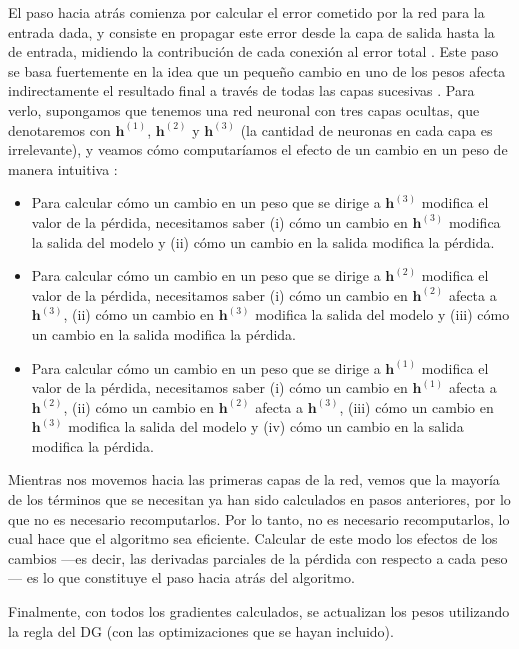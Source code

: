 \documentclass[../../main.tex]{subfiles}
\begin{document}
El paso hacia atrás comienza por calcular el error cometido por la red para la entrada
dada, y consiste en propagar este error desde la capa de salida hasta la de entrada,
midiendo la contribución de cada conexión al error total \cite{hands-on-ML-sklearn-tf}.
Este paso se basa fuertemente en la idea que un pequeño cambio en uno de los pesos afecta
indirectamente el resultado final a través de todas las capas sucesivas
\cite{prince2024understanding}. Para verlo, supongamos que tenemos una red neuronal con
tres capas ocultas, que denotaremos con \(\bm{h}^{(1)}\), \(\bm{h}^{(2)}\) y
\(\bm{h}^{(3)}\) (la cantidad de neuronas en cada capa es irrelevante), y veamos cómo
computaríamos el efecto de un cambio en un peso de manera intuitiva
\cite{prince2024understanding}:
\begin{itemize}
    \item Para calcular cómo un cambio en un peso que se dirige a \(\bm{h}^{(3)}\)
    modifica el valor de la pérdida, necesitamos saber (i) cómo un cambio en
    \(\bm{h}^{(3)}\) modifica la salida del modelo y (ii) cómo un cambio en la salida
    modifica la pérdida.
    \item Para calcular cómo un cambio en un peso que se dirige a \(\bm{h}^{(2)}\)
    modifica el valor de la pérdida, necesitamos saber (i) cómo un cambio en
    \(\bm{h}^{(2)}\) afecta a \(\bm{h}^{(3)}\), (ii) cómo un cambio en \(\bm{h}^{(3)}\)
    modifica la salida del modelo y (iii) cómo un cambio en la salida modifica la pérdida.
    \item Para calcular cómo un cambio en un peso que se dirige a \(\bm{h}^{(1)}\)
    modifica el valor de la pérdida, necesitamos saber (i) cómo un cambio en
    \(\bm{h}^{(1)}\) afecta a \(\bm{h}^{(2)}\), (ii) cómo un cambio en \(\bm{h}^{(2)}\)
    afecta a \(\bm{h}^{(3)}\), (iii) cómo un cambio en \(\bm{h}^{(3)}\) modifica la salida
    del modelo y (iv) cómo un cambio en la salida modifica la pérdida.
\end{itemize}
Mientras nos movemos hacia las primeras capas de la red, vemos que la mayoría de los
términos que se necesitan ya han sido calculados en pasos anteriores, por lo que no es
necesario recomputarlos. Por lo tanto, no es necesario recomputarlos, lo cual hace que el
algoritmo sea eficiente. Calcular de este modo los efectos de los cambios —es decir, las
derivadas parciales de la pérdida con respecto a cada peso— es lo que constituye el paso
hacia atrás del algoritmo.

Finalmente, con todos los gradientes calculados, se actualizan los pesos utilizando la
regla del DG (con las optimizaciones que se hayan incluido).
\end{document}
